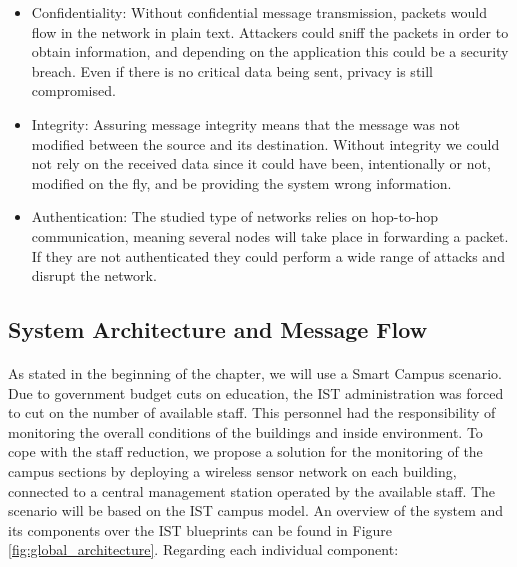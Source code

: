 \begin{itemize}
	\item Confidentiality: Without confidential message transmission, packets would flow in the network in plain text. Attackers could sniff the packets in order to obtain information, and depending on the application this could be a security breach. Even if there is no critical data being sent, privacy is still compromised.\\
	\item Integrity: Assuring message integrity means that the message was not modified between the source and its destination. Without integrity we could not rely on the received data since it could have been, intentionally or not, modified on the fly, and be providing the system wrong information.\\
	\item Authentication: The studied type of networks relies on hop-to-hop communication, meaning several nodes will take place in forwarding a packet. If they are not authenticated they could perform a wide range of attacks and disrupt the network.
\end{itemize}

\subsection{System Architecture and Message Flow}
\paragraph{}

As stated in the beginning of the chapter, we will use a Smart Campus scenario. Due to government budget cuts on education, the \ac{IST} administration was forced to cut on the number of available staff. This personnel had the responsibility of monitoring the overall conditions of the buildings and inside environment. To cope with the staff reduction, we propose a solution for the monitoring of the campus sections by deploying a wireless sensor network on each building, connected to a central management station operated by the available staff. The scenario will be based on the \ac{IST} campus model. An overview of the system and its components over the \ac{IST} blueprints can be found in Figure \ref{fig:global_architecture}. Regarding each individual component:


